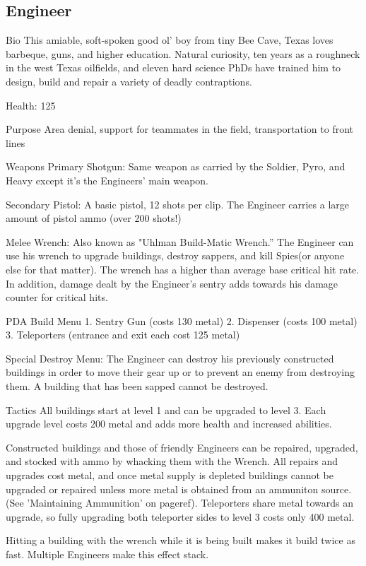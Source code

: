 \subsection{Engineer}
Bio
This amiable, soft-spoken good ol' boy from tiny Bee Cave, Texas loves barbeque, guns, and higher education. Natural curiosity, ten years as a roughneck in the west Texas oilfields, and eleven hard science PhDs have trained him to design, build and repair a variety of deadly contraptions.

Health: 125

Purpose
Area denial, support for teammates in the field, transportation to front lines

Weapons
Primary
Shotgun: Same weapon as carried by the Soldier, Pyro, and Heavy except it's the Engineers' main weapon.

Secondary
Pistol: A basic pistol, 12 shots per clip. The Engineer carries a large amount of pistol ammo (over 200 shots!)

Melee
Wrench: Also known as "Uhlman Build-Matic Wrench.” The Engineer can use his wrench to upgrade buildings, destroy sappers, and kill Spies(or anyone else for that matter). The wrench has a higher than average base critical hit rate.  In addition, damage dealt by the Engineer's sentry adds towards his damage counter for critical hits.

PDA
Build Menu
1.       Sentry Gun (costs 130 metal)
2.       Dispenser (costs 100 metal)
3.       Teleporters (entrance and exit each cost 125 metal)

Special
Destroy Menu: The Engineer can destroy his previously constructed buildings in order to move their gear up or to prevent an enemy from destroying them. A building that has been sapped cannot be destroyed.

Tactics
All buildings start at level 1 and can be upgraded to level 3.  Each upgrade level costs 200 metal and adds more health and increased abilities.

Constructed buildings and those of friendly Engineers can be repaired, upgraded, and stocked with ammo by whacking them with the Wrench.  All repairs and upgrades cost metal, and once metal supply is depleted buildings cannot be upgraded or repaired unless more metal is obtained from an ammuniton source.  (See 'Maintaining Ammunition' on {{pageref}}). Teleporters share metal towards an upgrade, so fully upgrading both teleporter sides to level 3 costs only 400 metal.

Hitting a building with the wrench while it is being built makes it build twice as fast.  Multiple Engineers make this effect stack.

